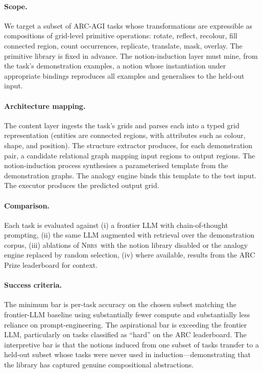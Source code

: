 \documentclass[11pt,a4paper]{article}
\theoremstyle{plain}
\theoremstyle{definition}
\theoremstyle{remark}
\newcommand{\NBRS}{\textsc{Nbrs}}
\begin{document}
\paragraph{Scope.}
We target a subset of ARC-AGI tasks whose transformations are expressible as compositions of grid-level primitive operations: rotate, reflect, recolour, fill connected region, count occurrences, replicate, translate, mask, overlay. The primitive library is fixed in advance. The notion-induction layer must mine, from the task's demonstration examples, a notion whose instantiation under appropriate bindings reproduces all examples and generalises to the held-out input.

\paragraph{Architecture mapping.}
The content layer ingests the task's grids and parses each into a typed grid representation (entities are connected regions, with attributes such as colour, shape, and position). The structure extractor produces, for each demonstration pair, a candidate relational graph mapping input regions to output regions. The notion-induction process synthesises a parameterised template from the demonstration graphs. The analogy engine binds this template to the test input. The executor produces the predicted output grid.

\paragraph{Comparison.}
Each task is evaluated against (i) a frontier LLM with chain-of-thought prompting, (ii) the same LLM augmented with retrieval over the demonstration corpus, (iii) ablations of \NBRS\ with the notion library disabled or the analogy engine replaced by random selection, (iv) where available, results from the ARC Prize leaderboard for context.

\paragraph{Success criteria.}
The minimum bar is per-task accuracy on the chosen subset matching the frontier-LLM baseline using substantially fewer compute and substantially less reliance on prompt-engineering. The aspirational bar is exceeding the frontier LLM, particularly on tasks classified as ``hard'' on the ARC leaderboard. The interpretive bar is that the notions induced from one subset of tasks transfer to a held-out subset whose tasks were never used in induction---demonstrating that the library has captured genuine compositional abstractions.
\end{document}
